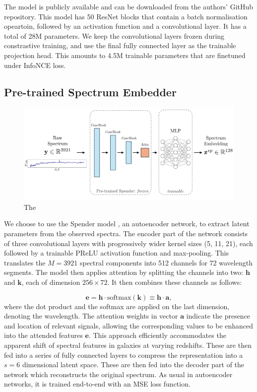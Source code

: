 \documentclass[a4paper,12pt]{article}
\begin{document}
The model is publicly available and can be downloaded from the authors' GitHub repository. This model has 50 ResNet blocks that contain a batch normalisation opeartoin, followed by an activation function and a convolutional layer. It has a total of 28M parameters. We keep the convolutional layers frozen during constrastive training, and use the final fully connected layer as the trainable projection head. This amounts to 4.5M trainable parameters that are finetuned under InfoNCE loss. 


\subsection{Pre-trained Spectrum Embedder}


\begin{figure}[H]
    \centering
    \includegraphics[width=\textwidth]{../figures/diagram_spender_cropped.pdf} %
    \caption{The }
    \label{fig:spender}
\end{figure}


We choose to use the Spender model \cite{spender}, an autoencoder network, to extract latent parameters from the observed spectra. The encoder part of the network consists of three convolutional layers with progressively wider kernel sizes (5, 11, 21), each followed by a trainable PReLU activation function and max-pooling. This translates the $M=3921$ spectral components into 512 channels for 72 wavelength segments. The model then applies attention by splitting the channels into two: $\mathbf{h}$ and $\mathbf{k}$, each of 
dimension $256 \times 72$. It then combines these channels as follows:

\begin{equation}
    \mathbf{e} = \mathbf{h} \cdot \text{softmax}(\mathbf{k}) \equiv \mathbf{h} \cdot \mathbf{a},
\end{equation}
where the dot product and the softmax are applied on the last dimension, denoting the wavelength. The attention weights in vector $\mathbf{a}$ indicate the presence and location of relevant signals, allowing the corresponding values to be enhanced into the attended features $\mathbf{e}$. This approach efficiently accommodates the apparent shift of spectral features in galaxies at varying redshifts. These are then fed into a series of fully connected layers to compress the representation into a $s=6$ dimensional latent space. These are then fed into the decoder part of the network which reconstructs the original spectrum. As usual in autoencoder networks, it is trained end-to-end with an MSE loss function. 
\end{document}
